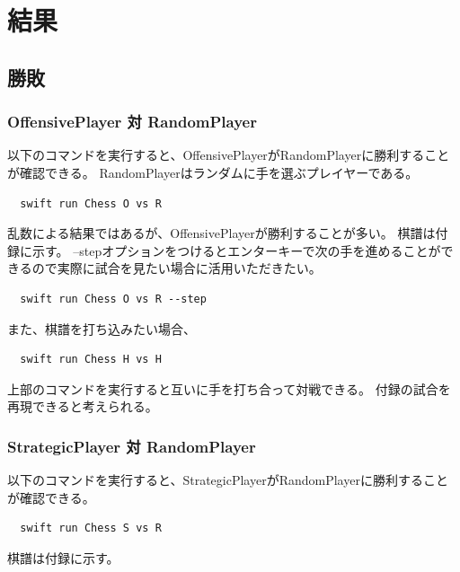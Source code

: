 \documentclass[12pt, a4paper, uplatex]{jsarticle}
\begin{document}
\newpage
\section{結果}
\subsection{勝敗}
\subsubsection{OffensivePlayer 対 RandomPlayer}
以下のコマンドを実行すると、OffensivePlayerがRandomPlayerに勝利することが確認できる。
RandomPlayerはランダムに手を選ぶプレイヤーである。
\begin{verbatim}
  swift run Chess O vs R
\end{verbatim}
乱数による結果ではあるが、OffensivePlayerが勝利することが多い。
棋譜は付録に示す。
--stepオプションをつけるとエンターキーで次の手を進めることができるので実際に試合を見たい場合に活用いただきたい。
\begin{verbatim}
  swift run Chess O vs R --step
\end{verbatim}

また、棋譜を打ち込みたい場合、
\begin{verbatim}
  swift run Chess H vs H
\end{verbatim}
上部のコマンドを実行すると互いに手を打ち合って対戦できる。
付録の試合を再現できると考えられる。

\subsubsection{StrategicPlayer 対 RandomPlayer}
以下のコマンドを実行すると、StrategicPlayerがRandomPlayerに勝利することが確認できる。
\begin{verbatim}
  swift run Chess S vs R
\end{verbatim}
棋譜は付録に示す。
\end{document}
